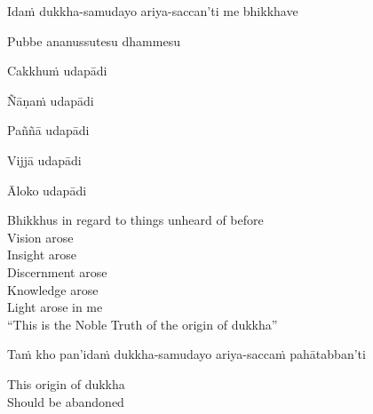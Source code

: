 \begin{pali-hang-first-line}
Idaṁ dukkha-samudayo ariya-saccan'ti me bhikkhave\\
\end{pali-hang-first-line}
\begin{pali-hang-together}
Pubbe ananussutesu dhammesu\\
\end{pali-hang-together}
\begin{pali-hang-together}
Cakkhuṁ udapādi\\
\end{pali-hang-together}
\begin{pali-hang-together}
Ñāṇaṁ udapādi\\
\end{pali-hang-together}
\begin{pali-hang-together}
Paññā udapādi\\
\end{pali-hang-together}
\begin{pali-hang-together}
Vijjā udapādi\\
\end{pali-hang-together}
\begin{pali-hang-together}
Āloko udapādi
\end{pali-hang-together}

\begin{english-verses}
  Bhikkhus in regard to things unheard of before\\
  Vision arose\\
  Insight arose\\
  Discernment arose\\
  Knowledge arose\\
  Light arose in me\\
  ``This is the Noble Truth of the origin of dukkha''
\end{english-verses}

\begin{pali-hang}
Taṁ kho pan'idaṁ dukkha-samudayo ariya-saccaṁ pahātabban'ti
\end{pali-hang}

\begin{english}
  This origin of dukkha\makeatletter\hyperlink{endnote167-appendix}\makeatother\\
  Should be abandoned
\end{english}


